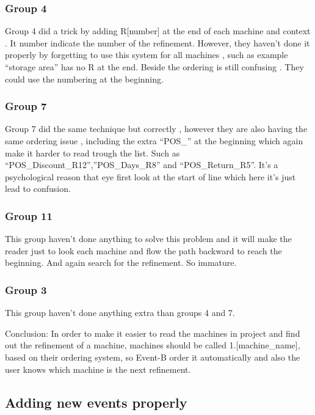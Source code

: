 \subsubsection{Group 4}
\label{group4}

Group 4 did a trick by adding R[number] at the end of each machine and context . It number indicate the number of the refinement. However, they haven't done it properly by forgetting to use this system for all machines , such as example “storage area” has no R at the end. Beside the ordering is still confusing . They could use the numbering at the beginning.

\subsubsection{Group 7}
\label{group7}

Group 7 did the same technique but correctly , however they are also having the same ordering issue , including the extra “POS\_” at the beginning which again make it harder to read trough the list. Such as “POS\_Discount\_R12”,”POS\_Days\_R8” and “POS\_Return\_R5”. It's a psychological reason that eye first look at the start of line which here it's just lead to confusion.

\subsubsection{Group 11}
\label{group11}

This group haven't done anything to solve this problem and it will make the reader just to look each machine and flow the path backward to reach the beginning. And again search for the refinement. So immature.

\subsubsection{Group 3}
\label{group3}

This group haven't done anything extra than groups 4 and 7.

Conclusion: In order to make it easier to read the machines in project and find out the refinement of a machine, machines should be called 1.[machine\_name], based on their ordering system, so Event-B order it automatically and also the user knows which machine is the next refinement. 

\subsection{Adding new events properly}
\label{addingneweventsproperly}

